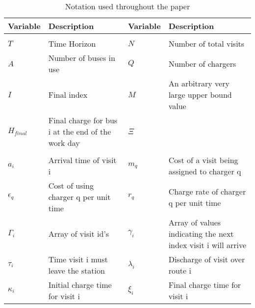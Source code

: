 \documentclass[conference]{IEEEtran}
\begin{document}
\begin{table*}[!t]
	\caption{Notation used throughout the paper}
	\label{tab:variables}
	\centering
	\begin{tabular}{l l l l}
		\toprule
		\textbf{Variable} & \textbf{Description} & \textbf{Variable} & \textbf{Description} \\
		\toprule
		\multicolumn{4}{l}{} \\
			$T$         & \textrm{Time Horizon}                                                         &
			$N$         & \textrm{Number of total visits}                                            \\
			$A$         & \textrm{Number of buses in use}                                               &
			$Q$         & \textrm{Number of chargers}                                                \\
			$I$         & \textrm{Final index}                                                          &
			$M$         & \textrm{An arbitrary very large upper bound value}                         \\
			$H_{final}$ & \textrm{Final charge for bus } i \textrm{ at the end of the work day}         &
			$\Xi$       & \\
		\hline
		\multicolumn{4}{l}{} \\
			$a_i$        & \textrm{Arrival time of visit } i                                                    &
			$m_q$        & \textrm{Cost of a visit being assigned to charger } q                                  \\
			$\epsilon_q$ & \textrm{Cost of using charger } q \textrm{ per unit time}                            &
			$r_q$        & \textrm{Charge rate of charger } q \textrm{ per unit time}                             \\
			$\Gamma_i$   & \textrm{Array of visit id's}                                                         &
			$\gamma_i$   & \textrm{Array of values indicating the next index visit } i \textrm{ will arrive}      \\
			$\tau_i$     & \textrm{Time visit } i \textrm{ must leave the station}                              &
			$\lambda_i$  & \textrm{Discharge of visit over route } i                                              \\
			$\kappa_i$   & \textrm{Initial charge time for visit } i                                            &
			$\xi_i$      & \textrm{Final charge time for visit } i                                                \\

\end{tabular}
\end{table*}
\end{document}

